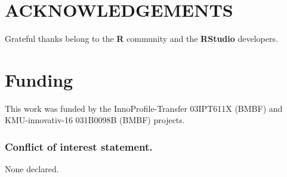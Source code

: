 \documentclass[a4,center,fleqn]{NAR}
\begin{document}
\section{ACKNOWLEDGEMENTS}

Grateful thanks belong to the \textbf{R} community and the \textbf{RStudio} 
developers.

\section{Funding}
This work was funded by the InnoProfile-Transfer 03IPT611X (BMBF) and 
KMU-innovativ-16 031B0098B (BMBF) projects.

\subsubsection{Conflict of interest statement.} None declared.



\end{document}
